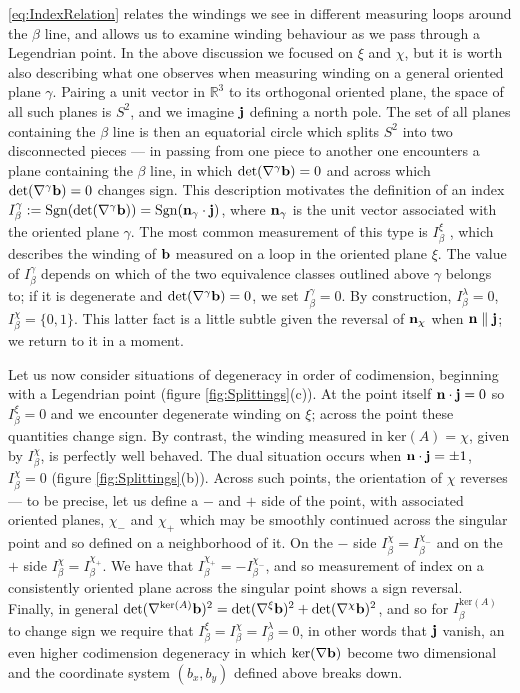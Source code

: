  \eqref{eq:IndexRelation} relates the windings we see in different measuring loops around the $\beta$ line, and allows us to examine winding behaviour as we pass through a Legendrian point. In the above discussion we focused on $\xi$ and $\chi$, but it is worth also describing what one observes when measuring winding on a general oriented plane $\gamma$. Pairing a unit vector in $\mathbb{R}^3$ to its orthogonal oriented plane, the space of all such planes is $S^2$, and we imagine $\mathbf{j} $ defining a north pole. The set of all planes containing the $\beta$ line is then an equatorial circle which splits $S^2$ into two disconnected pieces --- in passing from one piece to another one encounters a plane containing the $\beta$ line, in which $\mathrm{det}(\nabla^\gamma \mathbf{b}) = 0$ and across which $\mathrm{det}(\nabla^\gamma \mathbf{b}) = 0$ changes sign. This description motivates the definition of an index $ I^\gamma_\beta := \mathrm{Sgn}(\mathrm{det}(\nabla^\gamma \mathbf{b})) =\mathrm{Sgn}(\mathbf{n}_\gamma \cdot \mathbf{j})$, where $\mathbf{n}_\gamma$ is the unit vector associated with the oriented plane $\gamma$. The most common measurement of this type is $I^\xi_\beta$ \citep{Nye1987,Berry1998,Berry2004}, which describes the winding of $\mathbf{b}$ measured on a loop in the oriented plane $\xi$. The value of $I^\gamma_\beta$ depends on which of the two equivalence classes outlined above $\gamma$ belongs to; if it is degenerate and $\mathrm{det}(\nabla^\gamma \mathbf{b})=0$, we set $I^\gamma_\beta=0$. By construction, $I^\lambda_\beta=0$, $I^\chi_\beta= \{0,1\}$. This latter fact is a little subtle given the reversal of $\mathbf{n}_\chi$ when $\mathbf{n} \parallel \mathbf{j}$; we return to it in a moment.  

 Let us now consider situations of degeneracy in order of codimension, beginning with a Legendrian point (figure  \ref{fig:Splittings}(c)). At the point itself $\mathbf{n} \cdot \mathbf{j} =0$ so $I^\xi_\beta=0$ and we encounter degenerate winding on $\xi$; across the point these quantities change sign. By contrast, the winding measured in $\mathrm{ker}(A) = \chi$, given by $I^{\chi}_\beta$, is perfectly well behaved. The dual situation occurs when $\mathbf{n} \cdot \mathbf{j} = \pm 1$, $I^\chi_\beta=0$ (figure \ref{fig:Splittings}(b)). Across such points, the orientation of $\chi$ reverses --- to be precise, let us define a $-$ and $+$ side of the point, with associated oriented planes, $\chi_-$ and $\chi_+$ which may be smoothly continued across the singular point and so defined on a neighborhood of it. On the $-$ side $I^\chi_\beta = I_\beta^{\chi_-}$ and on the $+$ side $I_{\beta}^\chi = I_{\beta}^{\chi_+}$. We have that $I_{\beta}^{\chi_+} = -I_{\beta}^{\chi_-}$, and so measurement of index on a consistently oriented plane across the singular point shows a sign reversal. Finally, in general $\mathrm{det}(\nabla^{\ker(A)}\mathbf{b})^2 = \mathrm{det}(\nabla^\xi \mathbf{b})^2+ \mathrm{det}(\nabla^\chi \mathbf{b})^2$, and so for $I^{\mathrm{ker}(A)}_\beta$ to change sign we require that $I^\xi_\beta = I^\chi_\beta = I^\lambda_\beta=0$, in other words that $\mathbf{j}$ vanish, an even higher codimension degeneracy in which $\mathrm{ker}(\nabla \mathbf{b})$ become two dimensional and the coordinate system $(b_x,b_y)$ defined above breaks down. 

